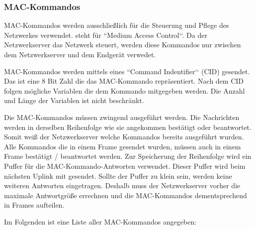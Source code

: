 \documentclass[a4paper,12pt]{article}
\begin{document}
            \subsubsection{MAC-Kommandos}
                MAC-Kommandos werden ausschließlich für die Steuerung und Pflege des Netzwerkes verwendet. steht 
                für ``Medium Access Control‘‘. Da der Netzwerkserver das Netzwerk steuert, werden diese Kommandos nur 
                zwischen dem Netzwerkserver und dem Endgerät verwedet.

                MAC-Kommandos werden mittels eines ``Command Indentifier‘‘ (CID) gesendet. Das ist eine 8 Bit Zahl die 
                das MAC-Kommando repräsentiert. Nach dem CID folgen mögliche Variablen die dem Kommando mitgegeben 
                werden. Die Anzahl und Länge der Variablen ist nicht beschränkt.
                
                Die MAC-Kommandos müssen zwingend ausgeführt werden. Die Nachrichten werden in derselben Reihenfolge 
                wie sie angekommen bestätigt oder beantwortet. Somit weiß der Netzwerkserver welche Kommandos 
                bereits ausgeführt wurden. Alle Kommandos die in einem Frame gesendet wurden, müssen auch in einem Frame  
                bestätigt / beantwortet werden. Zur Speicherung der Reihenfolge wird ein Puffer für die 
                MAC-Kommando-Antworten verwendet. Dieser Puffer wird beim nächsten Uplink mit gesendet. 
                Sollte der Puffer zu klein sein, werden keine weiteren Antworten eingetragen. 
                Deshalb muss der Netzwerkserver vorher die maximale Antwortgröße errechnen und die 
                MAC-Kommandos dementsprechend in Frames aufteilen.\cite[S.29 ff.]{LoRaSpec}

                Im Folgenden ist eine Liste aller MAC-Kommandos angegeben:
           
\end{document}
